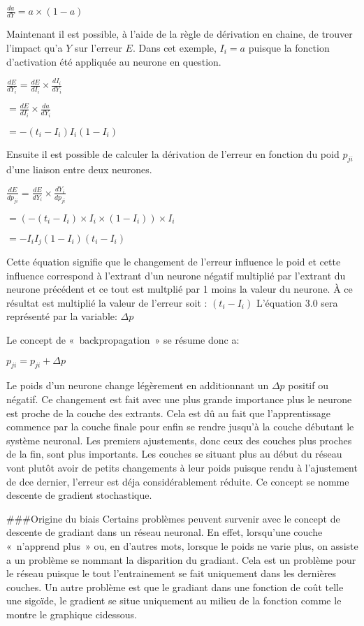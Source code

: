 \documentclass[letterpaper,10pt,french]{sphinxmanual}
\begin{document}
\(\frac{da}{dY}= a \times (1-a)\)

Maintenant il est possible, à l’aide de la règle de dérivation en chaine, de trouver l’impact
qu’a \(Y\) sur l’erreur \(E\). Dans cet exemple, \(I_i = a \) puisque la fonction d’activation été appliquée au neurone en question.

\(\frac{dE}{dY_i} = \frac{dE}{dI_i} \times \frac{dI_i}{dY_i}\)

\(= \frac{dE}{dI_i} \times \frac{da}{dY_i}\)

\(=-(t_i - I_i)  I_i (1- I_i)\)  

Ensuite il est possible de calculer la dérivation de l’erreur en fonction du poid \(p_{ji}\) d’une liaison entre deux neurones.

\(\frac{dE}{dp_{ji}} =\frac{dE}{dY_i} \times \frac{dY_i}{dp_{ji}} \)

\(= (-(t_i - I_i) \times I_i\times (1- I_i))\times I_i\)

\(= -I_i I_j (1-I_i)(t_i-I_i)\)

Cette équation signifie que le changement de l’erreur influence le poid et cette influence
correspond à l’extrant d’un neurone négatif multiplié par l’extrant du neurone précédent et
ce tout est multplié par 1 moins la valeur du neurone. À ce résultat est multiplié la valeur
de l’erreur soit : \((t_i-I_i)\)
L’équation 3.0 sera représenté par la variable:  \(\Delta p\)

Le concept de « backpropagation » se résume donc a:

\(p_{ji} = p_{ji} + \Delta p\)

Le poids d’un neurone change légèrement en additionnant un \(\Delta p\)  positif ou négatif. Ce changement
est fait avec une plus grande importance plus le neurone est proche de la couche des extrants. Cela est
dû au fait que l’apprentissage commence par la couche finale pour enfin se rendre jusqu’à la couche débutant
le système neuronal. Les premiers ajustements, donc ceux des couches plus proches de la fin, sont plus importants.
Les couches se situant plus au début du réseau vont plutôt avoir de petits changements à leur poids puisque
rendu à l’ajustement de dce dernier, l’erreur est déja considérablement réduite. Ce concept se nomme descente
de gradient stochastique.

\#\#\#Origine du biais
Certains problèmes peuvent survenir avec le concept de descente de gradiant dans un réseau neuronal.
En effet, lorsqu’une couche « n’apprend plus » ou, en d’autres mots, lorsque le poids ne varie plus,
on assiste a un problème se nommant la disparition du gradiant. Cela est un problème pour le réseau puisque
le tout l’entrainement se fait uniquement dans les dernières couches. Un autre problème est que le gradiant
dans une fonction de coût telle une sigoïde, le gradient se situe uniquement au milieu de la fonction comme
le montre le graphique ci\sphinxhyphen{}dessous.
\end{document}
